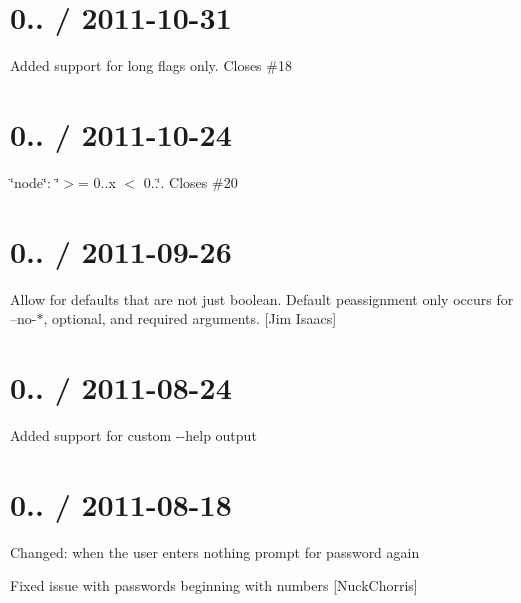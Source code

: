 \section*{0.. / 2011-\/10-\/31 }


\begin{DoxyItemize}
\item Added support for long flags only. Closes \#18
\end{DoxyItemize}

\section*{0.. / 2011-\/10-\/24 }


\begin{DoxyItemize}
\item \char`\"{}node\char`\"{}\+: \char`\"{}$>$= 0..\+x $<$ 0..\char`\"{}. Closes \#20
\end{DoxyItemize}

\section*{0.. / 2011-\/09-\/26 }


\begin{DoxyItemize}
\item Allow for defaults that are not just boolean. Default peassignment only occurs for --no-\/$\ast$, optional, and required arguments. \mbox{[}Jim Isaacs\mbox{]}
\end{DoxyItemize}

\section*{0.. / 2011-\/08-\/24 }


\begin{DoxyItemize}
\item Added support for custom {\ttfamily -\/-\/help} output
\end{DoxyItemize}

\section*{0.. / 2011-\/08-\/18 }


\begin{DoxyItemize}
\item Changed\+: when the user enters nothing prompt for password again
\item Fixed issue with passwords beginning with numbers \mbox{[}Nuck\+Chorris\mbox{]}
\end{DoxyItemize}

